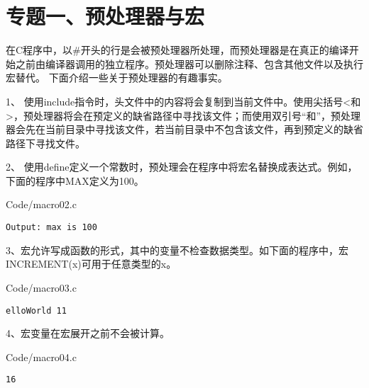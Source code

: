 \section{专题一、预处理器与宏}
\begin{frame}\ft{\secname}
在C程序中，以{\tf \#}开头的行是会被预处理器所处理，而预处理器是在真正的编译开始之前由编译器调用的独立程序。预处理器可以删除注释、包含其他文件以及执行宏替代。 下面介绍一些关于预处理器的有趣事实。
\end{frame}

\begin{frame}\ft{\secname}
1、 使用include指令时，头文件中的内容将会复制到当前文件中。使用尖括号{\tf <}和{\tf >}，预处理器将会在预定义的缺省路径中寻找该文件；而使用双引号“和”，预处理器会先在当前目录中寻找该文件，若当前目录中不包含该文件，再到预定义的缺省路径下寻找文件。
\end{frame}

\begin{frame}[fragile]\ft{\secname}
2、 使用define定义一个常数时，预处理会在程序中将宏名替换成表达式。例如，下面的程序中MAX定义为100。
\end{frame}

\begin{frame}[fragile]\ft{\secname}

{Code/macro02.c}
\pause
\begin{lstlisting}[backgroundcolor=\color{red!10}]
Output: max is 100
\end{lstlisting}

\end{frame}

\begin{frame}[fragile]\ft{\secname}
3、宏允许写成函数的形式，其中的变量不检查数据类型。如下面的程序中，宏{\tf INCREMENT(x)}可用于任意类型的{\tf x}。
\end{frame}

\begin{frame}[fragile]\ft{\secname}

{Code/macro03.c}
\pause
\begin{lstlisting}[backgroundcolor=\color{red!10}]
elloWorld 11
\end{lstlisting}
\end{frame}

\begin{frame}[fragile]\ft{\secname}
4、宏变量在宏展开之前不会被计算。
\end{frame}

\begin{frame}[fragile]\ft{\secname}

{Code/macro04.c}
\pause 
\begin{lstlisting}[backgroundcolor=\color{red!10}]
16
\end{lstlisting}
\end{frame}

